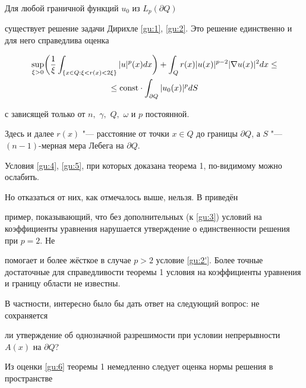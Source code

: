 \begin{theorem}Для любой граничной  функций $u_0$ из $L_p(\partial Q)$

существует решение задачи Дирихле \eqref{gu:1}{\rm ,} \eqref{gu:2}{\rm .} Это решение единственно и для него справедлива оценка 

\begin{multline}

\sup_{\xi > 0} \biggl( \frac{1}{\xi} \int_{\{ x\in Q : \xi <r(x)<2 \xi\}} |u|^p(x) dx\biggr) + \int_Q r(x) |u(x)|^{p-2} |\nabla u(x)|^2 dx \leq

\\

\leq{\mathop{\rm const}\nolimits } \cdot  \int_{\partial Q} |u_0(x)|^p dS  

\label{gu:6}

\end{multline} 

с зависящей только от $n,$ $\gamma,$ $Q,$ $\omega$ и $p$ постоянной{\rm .}

\end{theorem} 



\smallskip



Здесь и далее  $r(x)$ "--- расстояние от точки $x \in Q$ до границы $\partial Q$, а $S$ "--- $(n-1)$-мерная мера Лебега на $\partial Q$.



Условия \eqref{gu:4}, \eqref{gu:5}, при которых доказана теорема 1, по-видимому можно ослабить.

Но отказаться от них, как отмечалось выше, нельзя. В \cite{G88} приведён

пример, показывающий, что без дополнительных (к \eqref{gu:3}) условий на коэффициенты уравнения нарушается утверждение о единственности решения при $p = 2$. Не

помогает и более жёсткое в случае $p > 2$ условие  \eqref{gu:2'}. Более точные достаточные для справедливости теоремы 1 условия на коэффициенты уравнения и границу области не известны.

В частности, интересно было бы дать ответ на следующий вопрос: не сохраняется

ли утверждение об однозначной разрешимости при условии непрерывности $A(x)$ на $\partial Q$? 



Из оценки \eqref{gu:6} теоремы 1 немедленно следует оценка нормы решения в пространстве


